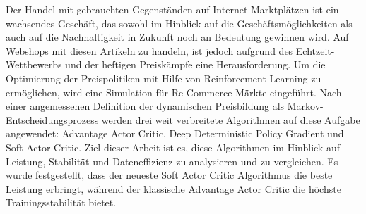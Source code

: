 Der Handel mit gebrauchten Gegenständen auf Internet-Marktplätzen ist ein wachsendes Geschäft, das sowohl im Hinblick auf die Geschäftsmöglichkeiten als auch auf die Nachhaltigkeit in Zukunft noch an Bedeutung gewinnen wird.
Auf Webshops mit diesen Artikeln zu handeln, ist jedoch aufgrund des Echtzeit-Wettbewerbs und der heftigen Preiskämpfe eine Herausforderung.
Um die Optimierung der Preispolitiken mit Hilfe von Reinforcement Learning zu ermöglichen, wird eine Simulation für Re-Commerce-Märkte eingeführt.
Nach einer angemessenen Definition der dynamischen Preisbildung als Markov-Entscheidungsprozess werden drei weit verbreitete Algorithmen auf diese Aufgabe angewendet:
Advantage Actor Critic, Deep Deterministic Policy Gradient und Soft Actor Critic.
Ziel dieser Arbeit ist es, diese Algorithmen im Hinblick auf Leistung, Stabilität und Dateneffizienz zu analysieren und zu vergleichen.
Es wurde festgestellt, dass der neueste Soft Actor Critic Algorithmus die beste Leistung erbringt, während der klassische Advantage Actor Critic die höchste Trainingsstabilität bietet.
